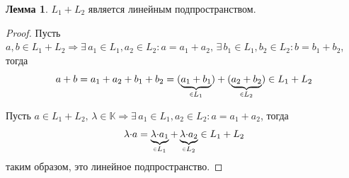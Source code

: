 \documentclass[12pt]{article}
\theoremstyle{definition}
\newtheorem{lemma}{Лемма}
\newcommand{\smallerrel}[1]{\mathrel{\mathpalette\smallerrelaux{#1}}}
\newcommand{\smallerrelaux}[2]{\raisebox{.1ex}{\scalebox{.75}{$#1#2$}}}
\newcommand{\smallin}{\smallerrel{\in}}
\begin{document}
\begin{lemma}
	$L_1 + L_2$ является линейным подпространством.
\end{lemma}
\begin{proof}
	Пусть $a,b \in L_1 + L_2 \Rightarrow \exists \, a_1 \in L_1, a_2 \in L_2 \colon a = a_1 + a_2, \, \exists \, b_1 \in L_1, b_2 \in L_2 \colon b = b_1 + b_2$, тогда 
	$$
		a + b = a_1 + a_2 + b_1 + b_2 = (\underbrace{a_1 + b_1}_{\smallin L_1}) + (\underbrace{a_2 + b_2}_{\smallin L_2}) \in L_1 + L_2
	$$
	
	Пусть $a \in L_1 + L_2, \, \lambda \in \mathbb{K} \Rightarrow \exists \, a_1 \in L_1, a_2 \in L_2 \colon a = a_1 + a_2$, тогда 
	$$
		\lambda{\cdot}a = \underbrace{\lambda{\cdot}a_1}_{\smallin L_1} + \underbrace{\lambda{\cdot}a_2}_{\smallin L_2} \in L_1 + L_2
	$$
	таким образом, это линейное подпространство.
\end{proof}
\end{document}
